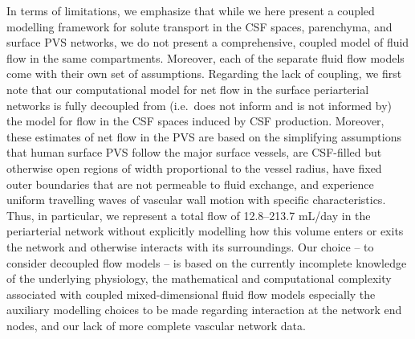 \documentclass[fleqn,10pt]{wlscirep}
\begin{document}
In terms of limitations, we emphasize that while we here present a
coupled modelling framework for solute transport in the CSF spaces,
parenchyma, and surface PVS networks, we do not present a
comprehensive, coupled model of fluid flow in the same
compartments. Moreover, each of the separate fluid flow models come
with their own set of assumptions. Regarding the lack of coupling, we
first note that our computational model for net flow in the surface
periarterial networks is fully decoupled from (i.e.~does not inform
and is not informed by) the model for flow in the CSF spaces induced
by CSF production. Moreover, these estimates of net flow in the PVS
are based on the simplifying assumptions that human surface PVS follow
the major surface vessels, are CSF-filled but otherwise open regions
of width proportional to the vessel radius, have fixed outer
boundaries that are not permeable to fluid exchange, and experience
uniform travelling waves of vascular wall motion with specific
characteristics. Thus, in particular, we represent a total flow of
12.8--213.7 mL/day in the periarterial network without explicitly
modelling how this volume enters or exits the network and otherwise
interacts with its surroundings. Our choice -- to consider decoupled
flow models -- is based on the currently incomplete knowledge of the
underlying physiology, the mathematical and computational complexity
associated with coupled mixed-dimensional fluid flow models especially
the auxiliary modelling choices to be made regarding interaction at
the network end nodes, and our lack of more complete vascular network
data.
\end{document}
